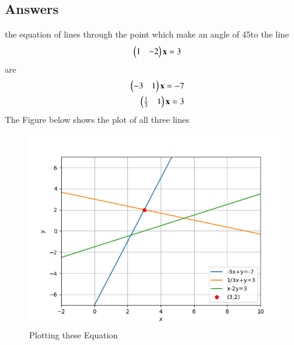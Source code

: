 \documentclass[journal,12pt,twocolumn]{IEEEtran}
\begin{document}
\subsection{Answers}
the equation of lines through the point   which make an angle of 45\degree to the line
\begin{align}
\begin{pmatrix}1 & -2\end{pmatrix}\mathbf{x} = 3 
\end{align}
are
\begin{align}
   \begin{pmatrix}-3 & 1\end{pmatrix}\mathbf{x}=-7\\ 
   \begin{pmatrix}\frac{1}{3} & 1\end{pmatrix}\mathbf{x}=3
\end{align}
The Figure below shows the plot of all three lines
\begin{figure}[!ht]
\centering
\includegraphics[width=\columnwidth]{Edit_plot.png}
\caption{Plotting these Equation}
\end{figure}
\end{document}
